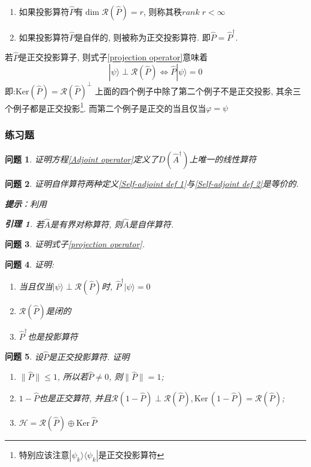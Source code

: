 \documentclass[a4paper,11pt]{article}
\theoremstyle{mystyle}
\newtheorem{lemma}{\hspace{2em}引理}[section]
\newtheorem{problem}{问题}[section]
\begin{document}
\begin{definition}
  \begin{enumerate}
    \item 如果投影算符$\hat{P}$有$\dim\mathcal{R}(\hat{P})=r$, 则称其秩$rank\;r<\infty$
    \item 如果投影算符$\hat{P}$是自伴的, 则被称为正交投影算符. 即$\hat{P}=\hat{P}^{\dag}$.
  \end{enumerate}
\end{definition}
若$\hat{P}$是正交投影算子, 则式子\eqref{projection operator}意味着
\begin{equation*}
  |\psi\rangle\perp\mathcal{R}(\hat{P})\Longleftrightarrow\hat{P}|\psi\rangle=0
\end{equation*}
即:$\mathrm{Ker}(\hat{P})=\mathcal{R}(\hat{P})^{\perp}$
上面的四个例子中除了第二个例子不是正交投影, 其余三个例子都是正交投影\footnote{特别应该注意$|\psi_k\rangle\langle\psi_k|$是正交投影算符}. 而第二个例子是正交的当且仅当$\varphi=\psi$
\subsubsection{练习题}
\begin{problem}
  证明方程\ref{Adjoint operator}定义了$D(\hat{A}^{\dag})$上唯一的线性算符
\end{problem}
\begin{problem}
  证明自伴算符两种定义\ref{Self-adjoint def 1}与\ref{Self-adjoint def 2}是等价的.

\indent\textbf{提示}：利用
\begin{lemma}
  若$\hat{A}$是有界对称算符, 则$\hat{A}$是自伴算符.
\end{lemma}
\end{problem}
\begin{problem}
  证明式子\eqref{projection operator}.
\end{problem}
\begin{problem}
  证明:
\begin{enumerate}
  \item 当且仅当$|\psi\rangle\perp\mathcal{R}(\hat{P})$时, $\hat{P}^{\dag}|\psi\rangle=0$
  \item $\mathcal{R}(\hat{P})$是闭的
  \item $\hat{P}^{\dag}$也是投影算符
\end{enumerate}
\end{problem}
\begin{problem}
  设$\hat{P}$是正交投影算符. 证明
  \begin{enumerate}
    \item $\|\hat{P}\|\leq1$, 所以若$\hat{P}\neq0$, 则$\|\hat{P}\|=1$;
    \item $1-\hat{P}$也是正交算符, 并且$\mathcal{R}(1-\hat{P})\perp\mathcal{R}(\hat{P}), \mathrm{Ker}\,(1-\hat{P})=\mathcal{R}(\hat{P})$;
    \item $\mathcal{H}=\mathcal{R}(\hat{P})\oplus \mathrm{Ker}\,\hat{P}$
  \end{enumerate}
\end{problem}
\end{document}

